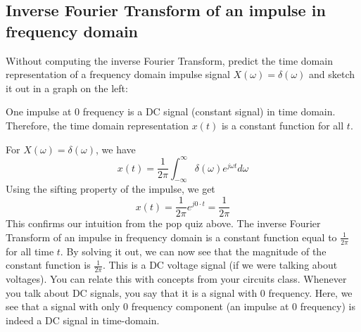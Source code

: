 \subsection{Inverse Fourier Transform of an impulse in frequency domain}
\begin{popquiz}
Without computing the inverse Fourier Transform, predict the time domain representation of a frequency domain impulse signal $X(\omega) = \delta(\omega)$ and sketch it out in a graph on the left:
  \begin{center}
  \end{center}
  \popqsplit 
  One impulse at 0 frequency is a DC signal (constant signal) in time domain. Therefore, the time domain representation $x(t)$ is a constant function for all $t$.
\end{popquiz}

For $X(\omega) = \delta(\omega)$, we have
\begin{equation*}
    x(t) = \frac{1}{2\pi} \int_{-\infty}^{\infty} \delta(\omega) e^{j\omega t} d\omega
\end{equation*}
Using the sifting property of the impulse, we get
\begin{equation*}
    x(t) = \frac{1}{2\pi} e^{j0 \cdot t} = \frac{1}{2\pi}
\end{equation*}
This confirms our intuition from the pop quiz above. The inverse Fourier Transform of an impulse in frequency domain is a constant function equal to $\frac{1}{2\pi}$ for all time $t$. By solving it out, we can now see that the magnitude of the constant function is $\frac{1}{2\pi}$. This is a DC voltage signal (if we were talking about voltages). You can relate this with concepts from your circuits class. Whenever you talk about DC signals, you say that it is a signal with 0 frequency. Here, we see that a signal with only 0 frequency component (an impulse at 0 frequency) is indeed a DC signal in time-domain.

